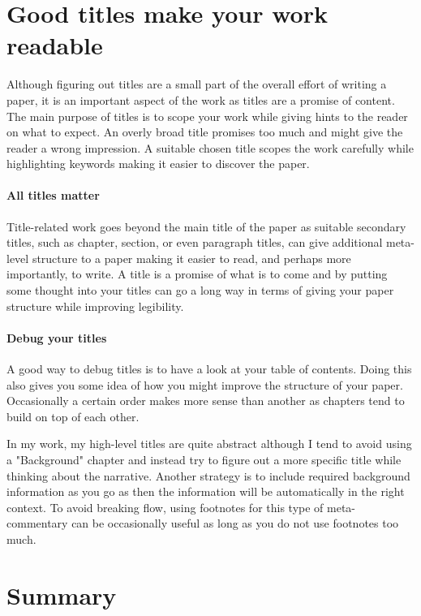 \section{Good titles make your work readable}

Although figuring out titles are a small part of the overall effort of writing a paper, it is an important aspect of the work as titles are a promise of content.
The main purpose of titles is to scope your work while giving hints to the reader on what to expect.
An overly broad title promises too much and might give the reader a wrong impression.
A suitable chosen title scopes the work carefully while highlighting keywords making it easier to discover the paper.

\paragraph{All titles matter}

Title-related work goes beyond the main title of the paper as suitable secondary titles, such as chapter, section, or even paragraph titles, can give additional meta-level structure to a paper making it easier to read, and perhaps more importantly, to write.
A title is a promise of what is to come and by putting some thought into your titles can go a long way in terms of giving your paper structure while improving legibility.

\paragraph{Debug your titles}

A good way to debug titles is to have a look at your table of contents.
Doing this also gives you some idea of how you might improve the structure of your paper.
Occasionally a certain order makes more sense than another as chapters tend to build on top of each other.

In my work, my high-level titles are quite abstract although I tend to avoid using a "Background" chapter and instead try to figure out a more specific title while thinking about the narrative.
Another strategy is to include required background information as you go as then the information will be automatically in the right context.
To avoid breaking flow, using footnotes for this type of meta-commentary can be occasionally useful as long as you do not use footnotes too much.

\section{Summary}

